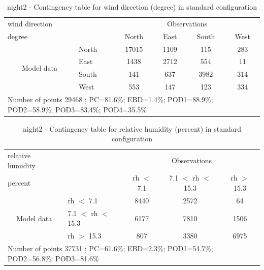 \begin{table}[p!]
\begin{center}
\begin{tabular}{llcccc}
\hline
{wind direction}                                       &                             &    \multicolumn{4}{c}{Observations}                 \\
{degree}                                       &                             & {North}   & {East} & {South} & {West} \\
\hline
\multicolumn{1}{c}{\multirow{4}{*}{Model data}}  & {North}                    & 17015   & 1109    & 115     & 283\\
                                                 & {East}                     & 1438   & 2712    & 554     & 11\\
                                                 & {South}                    & 141   & 637   & 3982    & 314\\
                                                 & {West}                     & 553  & 147   & 123    & 334\\
\hline 
\multicolumn{6}{l}{ Number of points        29468 ; PC=81.6\%; EBD=1.4\%; POD1=88.9\%; POD2=58.9\%; POD3=83.4\%; POD4=35.5\%}                 \\
\end{tabular}
\end{center}
\caption{night2 - Contingency table for {wind direction} (degree) in standard configuration}
\label{tab:contingencywdBEF:night2}
\end{table}
\begin{table}[p!]
\begin{center}
\begin{tabular}{llccc}
\hline
{relative humidity}                                       &                                                    & \multicolumn{3}{c}{Observations}                 \\
{percent}                                       &                             & rh $<$ 7.1   & 7.1 $<$ rh $<$ 15.3 & rh $>$ 15.3 \\
\hline
\multicolumn{1}{c}{\multirow{3}{*}{Model data}}  & rh $<$ 7.1             & 8440                & 2572                       & 64              \\
                                                 & 7.1  $<$ rh $<$ 15.3 & 6177                & 7810                       & 1506              \\
                                                 & rh $>$ 15.3             & 807                & 3380                       & 6975              \\
\hline
\multicolumn{5}{l}{ Number of points        37731 ; PC=61.6\%; EBD=2.3\%; POD1=54.7\%; POD2=56.8\%; POD3=81.6\%}
\end{tabular}
\end{center}
\caption{night2 - Contingency table for  relative humidity (percent) in standard configuration}
\label{tab:contingencyrhBEF:night2}
\end{table}
